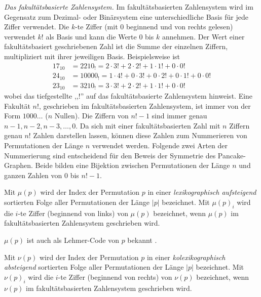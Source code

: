 \documentclass[a4paper, 10pt, ngerman]{article}
\begin{document}
\emph{Das fakultätsbasierte Zahlensystem.} Im fakultätsbasierten Zahlensystem wird im Gegensatz zum Dezimal- oder Binärsystem eine unterschiedliche Basis für jede Ziffer verwendet. Die $k$-te Ziffer (mit 0 beginnend und von rechts gelesen) verwendet $k!$ als Basis und kann die Werte 0 bis $k$ annehmen. Der Wert einer fakultätsbasiert geschriebenen Zahl ist die Summe der einzelnen Ziffern, multipliziert mit ihrer jeweiligen Basis. Beispielsweise ist
\begin{align*}
    17_{10} & = 2210_!   = 2 \cdot 3! + 2 \cdot 2! + 1 \cdot 1! + 0 \cdot 0!             \\
    24_{10} & = 10000_! = 1 \cdot 4! + 0 \cdot 3! + 0 \cdot 2! + 0 \cdot 1! + 0 \cdot 0! \\
    23_{10} & = 3210_!  = 3 \cdot 3! + 2 \cdot 2! + 1 \cdot 1! + 0 \cdot 0!
\end{align*}
wobei das tiefgestellte ,,!'' auf das fakultätsbasierte Zahlensystem hinweist. Eine Fakultät $n!$, geschrieben im fakultätsbasierten Zahlensystem, ist immer von der Form $1000\dots$ ($n$ Nullen). Die Ziffern von $n! - 1$ sind immer genau $n-1, n-2, n-3, \dots, 0$.
Da sich mit einer fakultätsbasierten Zahl mit $n$ Ziffern genau $n!$ Zahlen darstellen lassen, können diese Zahlen zum Nummerieren von Permutationen der Länge $n$ verwendet werden. Folgende zwei Arten der Nummerierung sind entscheidend für den Beweis der Symmetrie des Pancake-Graphen. Beide bilden eine Bijektion zwischen Permutationen der Länge $n$ und ganzen Zahlen von 0 bis $n! - 1$.

\begin{definition}
    Mit $\mu(p)$ wird der Index der Permutation $p$ in einer \emph{lexikographisch aufsteigend} sortierten Folge aller Permutationen der Länge $|p|$ bezeichnet. Mit $\mu(p)_i$ wird die $i$-te Ziffer (beginnend von links) von $\mu(p)$ bezeichnet, wenn $\mu(p)$ im fakultätsbasierten Zahlensystem geschrieben wird.
\end{definition}

$\mu(p)$ ist auch als Lehmer-Code von $p$ bekannt \cite{factorial}.

\begin{definition}
    Mit $\nu(p)$ wird der Index der Permutation $p$ in einer \emph{kolexikographisch absteigend} sortierten Folge aller Permutationen der Länge $|p|$ bezeichnet. Mit $\nu(p)_i$ wird die $i$-te Ziffer (beginnend von rechts) von $\nu(p)$ bezeichnet, wenn $\nu(p)$ im fakultätsbasierten Zahlensystem geschrieben wird.
\end{definition}
\end{document}
